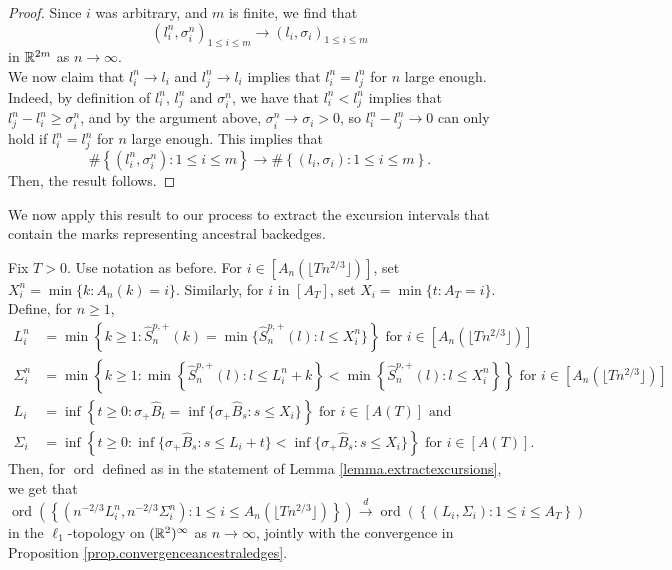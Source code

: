 \begin{proof}
Since $i$ was arbitrary, and $m$ is finite, we find that $$(l_i^n,\sigma_i^n)_{1\leq i\leq m}\to (l_i,\sigma_i)_{1\leq i\leq m}$$
in ${\mathbb R}^{2m}$ as $n\to \infty$. \\
We now claim that $l_i^n\to l_i$ and $l_j^n\to l_i$ implies that $l_i^n=l_j^n$ for $n$ large enough. Indeed, by definition of $l_i^n$, $l_j^n$ and $\sigma_i^n$, we have that $l_i^n<l_j^n$ implies that $l_j^n-l_i^n\geq \sigma_i^n$, and by the argument above, $\sigma_i^n\to \sigma_i>0$, so $l_i^n-l_j^n\to 0$ can only hold if $l_i^n=l_j^n$ for $n$ large enough. This implies that 
$$\#\left\{(l_i^n,\sigma_i^n):1\leq i \leq m\right\}\to \#\left\{(l_i,\sigma_i):1\leq i \leq m\right\}.$$
Then, the result follows.
\end{proof}

We now apply this result to our process to extract the excursion intervals that contain the marks representing ancestral backedges.
\begin{proposition}\label{prop.extractexcursions}
Fix $T>0$. Use notation as before. For $i\in \left[A_n\left(\lfloor T n^{2/3}\rfloor\right)\right]$, set $X_i^n=\min\{k:A_n(k)=i\}$. Similarly, for $i$ in $\left[A_T\right]$, set $X_i=\min\{t:A_T=i\}$. Define, for $n\geq 1$,
\begin{align*}L_i^n&=\min\left\{k\geq 1:\hat{S}^{p,+}_n(k)=\min\{\hat{S}^{p,+}_n(l):l\leq X_i^n\}\right\}\text{ for }i\in \left[A_n\left(\lfloor T n^{2/3}\rfloor\right)\right]\\
\Sigma_i^n&=\min\left\{k \geq 1: \min\left\{\hat{S}^{p,+}_n(l):l\leq L_i^n+k\right\} < \min\left\{\hat{S}^{p,+}_n(l):l\leq X_i^n\right\}\right\}\text{ for }i\in \left[A_n\left(\lfloor T n^{2/3}\rfloor\right)\right]\\
L_i&=\inf\left\{t\geq 0:\sigma_+\hat{B}_t=\inf\{\sigma_+\hat{B}_s:s\leq X_i\}\right\}\text{ for }i\in \left[A(T )\right]\text{ and}\\
\Sigma_i&=\inf\left\{ t\geq 0: \inf\{\sigma_+\hat{B}_s:s\leq L_i+t\} < \inf\{\sigma_+\hat{B}_s:s\leq X_i\}\right\}\text{ for }i\in \left[A(T )\right].
\end{align*}
Then, for $\operatorname{ord}$ defined as in the statement of Lemma \ref{lemma.extractexcursions}, we get that
$$\operatorname{ord}\left(\left\{\left(n^{-2/3}L_i^n,n^{-2/3}\Sigma_i^n\right):1\leq i \leq A_n\left(\lfloor T n^{2/3}\rfloor\right)\right\}\right)\overset{d}{\to} \operatorname{ord}\left(\left\{(L_i,\Sigma_i):1\leq i \leq A_T\right\}\right)$$
in the $\ell_1$-topology on $({\mathbb R}^2)^\infty$ as $n\to \infty$, jointly with the convergence in Proposition \ref{prop.convergenceancestraledges}. 
\end{proposition}
